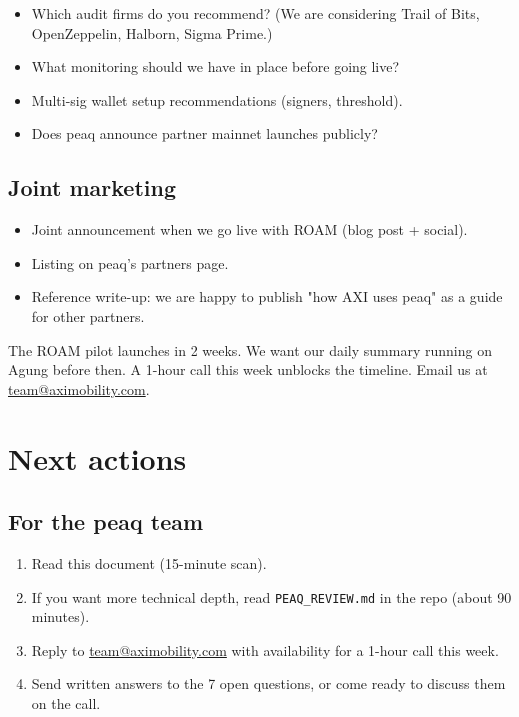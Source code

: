 \documentclass[11pt,a4paper]{article}
\begin{document}
\begin{itemize}[leftmargin=*]
  \item Which audit firms do you recommend? (We are considering Trail of Bits, OpenZeppelin, Halborn, Sigma Prime.)
  \item What monitoring should we have in place before going live?
  \item Multi-sig wallet setup recommendations (signers, threshold).
  \item Does peaq announce partner mainnet launches publicly?
\end{itemize}

\subsection{Joint marketing}

\begin{itemize}[leftmargin=*]
  \item Joint announcement when we go live with ROAM (blog post + social).
  \item Listing on peaq's partners page.
  \item Reference write-up: we are happy to publish "how AXI uses peaq" as a guide for other partners.
\end{itemize}

\begin{warningbox}[title=Time-sensitive]
The ROAM pilot launches in 2 weeks. We want our daily summary running on Agung before then. A 1-hour call this week unblocks the timeline. Email us at \href{mailto:team@aximobility.com}{team@aximobility.com}.
\end{warningbox}

\section{Next actions}

\subsection{For the peaq team}

\begin{enumerate}[leftmargin=*]
  \item Read this document (15-minute scan).
  \item If you want more technical depth, read \texttt{PEAQ\_REVIEW.md} in the repo (about 90 minutes).
  \item Reply to \href{mailto:team@aximobility.com}{team@aximobility.com} with availability for a 1-hour call this week.
  \item Send written answers to the 7 open questions, or come ready to discuss them on the call.
\end{enumerate}
\end{document}
